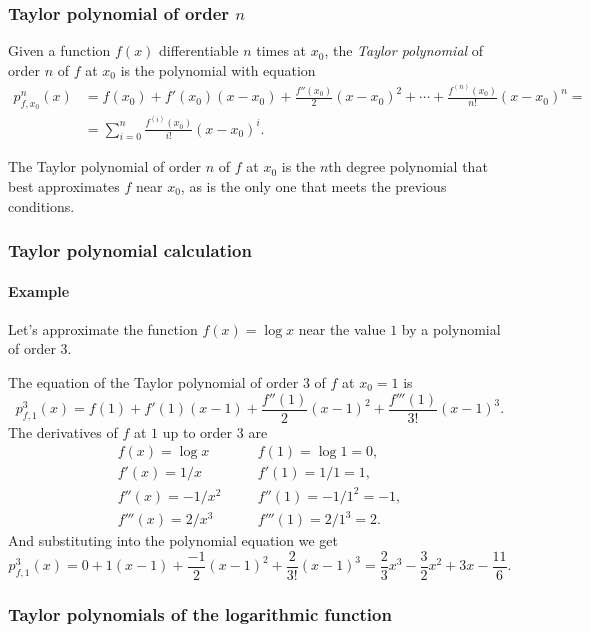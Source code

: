 \begin{frame}
\frametitle{Taylor polynomial of order $n$}
\begin{definition}
Given a function $f(x)$ differentiable $n$ times at $x_0$, the \emph{Taylor polynomial} of order $n$ of $f$ at $x_0$ is the polynomial with equation
\begin{align*}
p_{f,x_0}^n(x) &= f(x_0) + f'(x_0)(x-x_0) + \frac{f''(x_0)}{2}(x-x_0)^2 + \cdots + \frac{f^{(n)}(x_0)}{n!}(x-x_0)^n = \\ 
&= \sum_{i=0}^{n}\frac{f^{(i)}(x_0)}{i!}(x-x_0)^i.
\end{align*}
\end{definition}

The Taylor polynomial of order $n$ of $f$ at $x_0$ is the $n$th degree polynomial that best approximates $f$ near $x_0$, as is the only one that meets the previous conditions.
\end{frame} 


\begin{frame}
\frametitle{Taylor polynomial calculation}
\framesubtitle{Example}
Let's approximate the function $f(x)=\log x$ near the value $1$ by a polynomial of order $3$.

The equation of the Taylor polynomial of order $3$ of $f$ at $x_0=1$ is
\[
p_{f,1}^3(x)=f(1)+f'(1)(x-1)+\frac{f''(1)}{2}(x-1)^2+\frac{f'''(1)}{3!}(x-1)^3.
\]
The derivatives of $f$ at $1$ up to order $3$ are
\[
\begin{array}{lll}
f(x)=\log x & \quad & f(1)=\log 1 =0,\\
f'(x)=1/x & & f'(1)=1/1=1,\\
f''(x)=-1/x^2 & & f''(1)=-1/1^2=-1,\\
f'''(x)=2/x^3 & & f'''(1)=2/1^3=2.
\end{array}
\]
And substituting into the polynomial equation we get
\[
p_{f,1}^3(x)=0+1(x-1)+\frac{-1}{2}(x-1)^2+\frac{2}{3!}(x-1)^3= \frac{2}{3}x^3-\frac{3}{2}x^2+3x-\frac{11}{6}.
\]
\end{frame}


\begin{frame}
\frametitle{Taylor polynomials of the logarithmic function}
\begin{center}

\end{center}
\end{frame}


